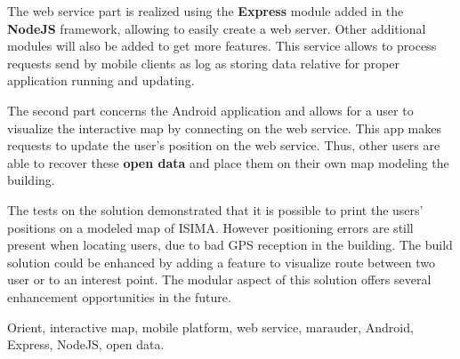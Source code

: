 The web service part is realized using the \textbf{Express} module added in the \textbf{NodeJS} framework, allowing to easily create a web server. Other additional modules will also be added to get more features. This service allows to process requests send by mobile clients as log as storing data relative for proper application running and updating.

The second part concerns the Android application and allows for a user to visualize the interactive map by connecting on the web service. This app makes requests to update the user's position on the web service. Thus, other users are able to recover these \textbf{open data} and place them on their own map modeling the building.

The tests on the solution demonstrated that it is possible to print the users' positions on a modeled map of ISIMA. However positioning errors are still present when locating users, due to bad GPS reception in the building. The build solution could be enhanced by adding a feature to visualize route between two user or to an interest point. The modular aspect of this solution offers several enhancement opportunities in the future.

Orient, interactive map, mobile platform, web service, marauder, Android, Express, NodeJS, open data.



